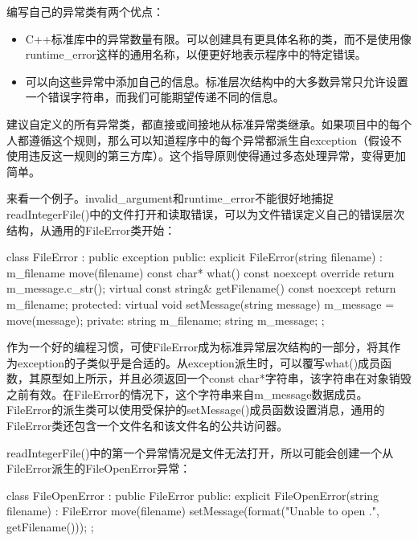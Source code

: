 编写自己的异常类有两个优点：

\begin{itemize}
\item
C++标准库中的异常数量有限。可以创建具有更具体名称的类，而不是使用像runtime\_error这样的通用名称，以便更好地表示程序中的特定错误。

\item
可以向这些异常中添加自己的信息。标准层次结构中的大多数异常只允许设置一个错误字符串，而我们可能期望传递不同的信息。
\end{itemize}

建议自定义的所有异常类，都直接或间接地从标准异常类继承。如果项目中的每个人都遵循这个规则，那么可以知道程序中的每个异常都派生自exception（假设不使用违反这一规则的第三方库）。这个指导原则使得通过多态处理异常，变得更加简单。

来看一个例子。invalid\_argument和runtime\_error不能很好地捕捉readIntegerFile()中的文件打开和读取错误，可以为文件错误定义自己的错误层次结构，从通用的FileError类开始：

\begin{cpp}
class FileError : public exception
{
    public:
        explicit FileError(string filename) : m_filename { move(filename) } {}
        const char* what() const noexcept override { return m_message.c_str(); }
        virtual const string& getFilename() const noexcept { return m_filename; }
    protected:
        virtual void setMessage(string message) { m_message = move(message); }
    private:
        string m_filename;
        string m_message;
};
\end{cpp}

作为一个好的编程习惯，可使FileError成为标准异常层次结构的一部分，将其作为exception的子类似乎是合适的。从exception派生时，可以覆写what()成员函数，其原型如上所示，并且必须返回一个const char*字符串，该字符串在对象销毁之前有效。在FileError的情况下，这个字符串来自m\_message数据成员。FileError的派生类可以使用受保护的setMessage()成员函数设置消息，通用的FileError类还包含一个文件名和该文件名的公共访问器。

readIntegerFile()中的第一个异常情况是文件无法打开，所以可能会创建一个从FileError派生的FileOpenError异常：

\begin{cpp}
class FileOpenError : public FileError
{
    public:
    explicit FileOpenError(string filename) : FileError { move(filename) }
    {
        setMessage(format("Unable to open {}.", getFilename()));
    }
};
\end{cpp}


